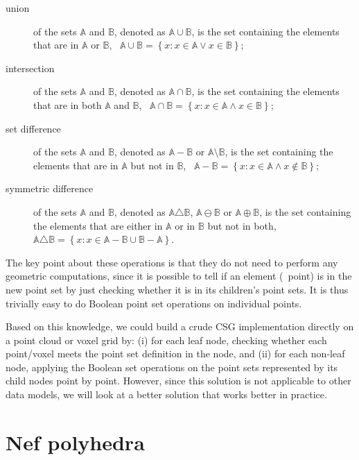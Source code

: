 \begin{description}
\item[union] of the sets \(\mathbb{A}\) and \(\mathbb{B}\), denoted as \(\mathbb{A} \cup \mathbb{B}\), is the set containing the elements that are in \(\mathbb{A}\) or \(\mathbb{B}\), \ie\ \( \mathbb{A} \cup \mathbb{B} = \left\{ x : x \in \mathbb{A} \vee x \in \mathbb{B} \right\} \);
\item[intersection] of the sets \(\mathbb{A}\) and \(\mathbb{B}\), denoted as \(\mathbb{A} \cap \mathbb{B}\), is the set containing the elements that are in both \(\mathbb{A}\) and \(\mathbb{B}\), \ie\ \( \mathbb{A} \cap \mathbb{B} = \left\{ x : x \in \mathbb{A} \wedge x \in \mathbb{B} \right\} \);
\item[set difference] of the sets \(\mathbb{A}\) and \(\mathbb{B}\), denoted as \(\mathbb{A} - \mathbb{B}\) or \(\mathbb{A} \setminus \mathbb{B}\), is the set containing the elements that are in \(\mathbb{A}\) but not in \(\mathbb{B}\), \ie\ \( \mathbb{A} - \mathbb{B} = \left\{ x : x \in \mathbb{A} \wedge x \notin \mathbb{B} \right\} \);
\item[symmetric difference] of the sets \(\mathbb{A}\) and \(\mathbb{B}\), denoted as \(\mathbb{A} \triangle \mathbb{B}\), \(\mathbb{A} \ominus \mathbb{B}\) or \(\mathbb{A} \oplus \mathbb{B}\), is the set containing the elements that are either in \(\mathbb{A}\) or in \(\mathbb{B}\) but not in both, \ie\ \( \mathbb{A} \triangle \mathbb{B} = \left\{ x : x \in \mathbb{A} - \mathbb{B} \cup \mathbb{B} - \mathbb{A} \right\} \).
\end{description}

The key point about these operations is that they do not need to perform any geometric computations, since it is possible to tell if an element (\ie\ point) is in the new point set by just checking whether it is in its children's point sets.
It is thus trivially easy to do Boolean point set operations on individual points.

Based on this knowledge, we could build a crude CSG implementation directly on a point cloud or voxel grid by: (i) for each leaf node, checking whether each point/voxel meets the point set definition in the node, and (ii) for each non-leaf node, applying the Boolean set operations on the point sets represented by its child nodes point by point.
However, since this solution is not applicable to other data models, we will look at a better solution that works better in practice.

\section{Nef polyhedra}

